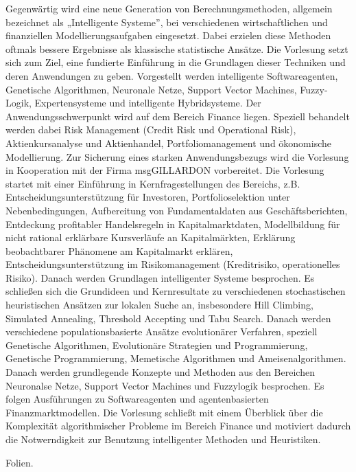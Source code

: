 \begin{course}
\begin{content}
Gegenwärtig wird eine neue Generation von Berechnungsmethoden, allgemein bezeichnet als „Intelligente Systeme”, bei verschiedenen wirtschaftlichen und finanziellen Modellierungsaufgaben eingesetzt. Dabei erzielen diese Methoden oftmals bessere Ergebnisse als klassische statistische Ansätze. Die Vorlesung setzt sich zum Ziel, eine fundierte Einführung in die Grundlagen dieser Techniken und deren Anwendungen zu geben. Vorgestellt werden intelligente Softwareagenten, Genetische Algorithmen, Neuronale Netze, Support Vector Machines, Fuzzy-Logik, Expertensysteme und intelligente Hybridsysteme. Der Anwendungsschwerpunkt wird auf dem Bereich Finance liegen. Speziell behandelt werden dabei Risk Management (Credit Risk und Operational Risk), Aktienkursanalyse und Aktienhandel, Portfoliomanagement und ökonomische Modellierung. Zur Sicherung eines starken Anwendungsbezugs wird die Vorlesung in Kooperation mit der Firma msgGILLARDON vorbereitet. Die Vorlesung startet mit einer Einführung in Kernfragestellungen des Bereichs, z.B. Entscheidungsunterstützung für Investoren, Portfolioselektion unter Nebenbedingungen, Aufbereitung von Fundamentaldaten aus Geschäftsberichten, Entdeckung profitabler Handelsregeln in Kapitalmarktdaten, Modellbildung für nicht rational erklärbare Kursverläufe an Kapitalmärkten, Erklärung beobachtbarer Phänomene am Kapitalmarkt erklären, Entscheidungsunterstützung im Risikomanagement (Kreditrisiko, operationelles Risiko). Danach werden Grundlagen intelligenter Systeme besprochen. Es schließen sich die Grundideen und Kernresultate zu verschiedenen stochastischen heuristischen Ansätzen zur lokalen Suche an, insbesondere Hill Climbing, Simulated Annealing, Threshold Accepting und Tabu Search. Danach werden verschiedene populationsbasierte Ansätze evolutionärer Verfahren, speziell Genetische Algorithmen, Evolutionäre Strategien und Programmierung, Genetische Programmierung, Memetische Algorithmen und Ameisenalgorithmen. Danach werden grundlegende Konzepte und Methoden aus den Bereichen Neuronalse Netze, Support Vector Machines und Fuzzylogik besprochen. Es folgen Ausführungen zu Softwareagenten und agentenbasierten Finanzmarktmodellen. Die Vorlesung schließt mit einem Überblick über die Komplexität algorithmischer Probleme im Bereich Finance und motiviert dadurch die Notwerndigkeit zur Benutzung intelligenter Methoden und Heuristiken.


\end{content}

\begin{media}Folien.


\end{media}
\end{course}
